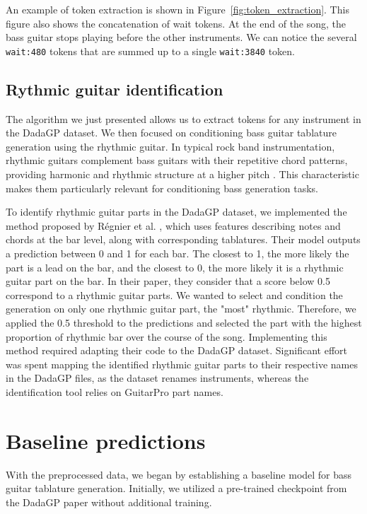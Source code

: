 An example of token extraction is shown in Figure~\ref{fig:token_extraction}.
This figure also shows the concatenation of wait tokens.
At the end of the song, the bass guitar stops playing before the other instruments.
We can notice the several \texttt{wait:480} tokens that are summed up to a single \texttt{wait:3840} token.


\subsection{Rythmic guitar identification}

The algorithm we just presented allows us to extract tokens for any instrument in the DadaGP dataset.
We then focused on conditioning bass guitar tablature generation using the rhythmic guitar.
In typical rock band instrumentation, rhythmic guitars complement bass guitars with their repetitive chord patterns, providing harmonic and rhythmic structure at a higher pitch \cite{regnier_identification_2021}.
This characteristic makes them particularly relevant for conditioning bass generation tasks.

To identify rhythmic guitar parts in the DadaGP dataset, we implemented the method proposed by Régnier et al. \cite{regnier_identification_2021},
which uses features describing notes and chords at the bar level, along with corresponding tablatures.
Their model outputs a prediction between 0 and 1 for each bar. The closest to 1, the more likely the part is a lead on the bar, and the closest to 0, the more likely it is a rhythmic guitar part on the bar.
In their paper, they consider that a score below 0.5 correspond to a rhythmic guitar parts. We wanted to select and condition the generation on only one rhythmic guitar part, the "most" rhythmic.
Therefore, we applied the 0.5 threshold to the predictions and selected the part with the highest proportion of rhythmic bar over the course of the song.
Implementing this method required adapting their code to the DadaGP dataset.
Significant effort was spent mapping the identified rhythmic guitar parts to their respective names in the DadaGP files, as the dataset renames instruments, whereas the identification tool relies on GuitarPro part names.

\section{Baseline predictions}

With the preprocessed data, we began by establishing a baseline model for bass guitar tablature generation.
Initially, we utilized a pre-trained checkpoint from the DadaGP paper \cite{sarmento_dadagp_2021} without additional training.

